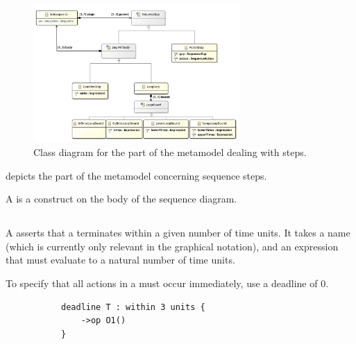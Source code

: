 \begin{figure}
	\centering
	\includegraphics[width=0.7\textwidth]{diagrams/Steps}
	\caption{Class diagram for the part of the \langname{} metamodel dealing with steps.}
	\label{fig:metamodel-steps}
\end{figure}

 depicts the part of the metamodel concerning
sequence steps.

A \msequencestep{} is a construct on the body of the sequence diagram.


\subsection{\mdeadlinestep}

A \mdeadlinestep{} asserts that a \msubsequence{} terminates within
a given number of time units.  
It takes a name (which is currently only
relevant in the graphical notation), and an expression that must
evaluate to a natural number of time units.

To specify that all actions in a \msubsequence{} must occur
immediately, use a deadline of \(0\).

\begin{figure}[h!]
\begin{subfigure}[t]{\egtextwidth}
\begin{lstlisting}[style=Example]
deadline T : within 3 units {
    ->op O1()
}
\end{lstlisting}
\end{subfigure}
\hfill
\begin{subfigure}[t]{\eggraphicalwidth}
  \gsecaption
  \centering
\end{subfigure}
\end{figure}


